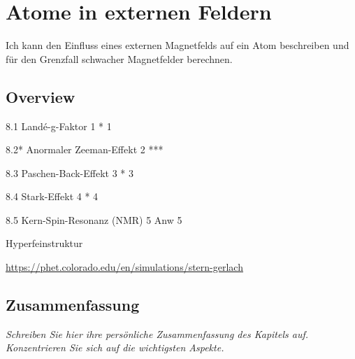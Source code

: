 \renewcommand{\lastmod}{10. September 2024}
\renewcommand{\chapterauthors}{Markus Lippitz}

\chapter{Atome in externen Feldern}





Ich kann den Einfluss eines externen Magnetfelds auf ein Atom beschreiben und für den Grenzfall schwacher Magnetfelder berechnen.

\section{Overview}




8.1 Landé-g-Faktor 1	*	1 

8.2* Anormaler Zeeman-Effekt 2	***

8.3 Paschen-Back-Effekt 3	*	3 

8.4 Stark-Effekt 4	*	4 

8.5 Kern-Spin-Resonanz (NMR) 5	Anw	5 

Hyperfeinstruktur 


\url{https://phet.colorado.edu/en/simulations/stern-gerlach}




\section{Zusammenfassung}

\textit{Schreiben Sie hier ihre persönliche Zusammenfassung des Kapitels auf. Konzentrieren Sie sich auf die wichtigsten Aspekte.}

\vspace*{10cm}

\printbibliography[segment=\therefsegment,heading=subbibliography]
